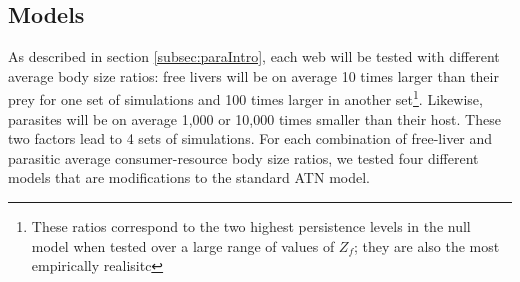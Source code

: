 \documentclass[11pt]{amsart}
\begin{document}
\subsection{Models\label{subsec:models}}

As described in section \ref{subsec:paraIntro}, each web will be tested with different average body size ratios: free livers will be on average 10 times larger than their prey for one set of simulations and 100 times larger in another set\footnote{These ratios correspond to the two highest persistence levels in the null model when tested over a large range of values of $Z_f$; they are also the most empirically realisitc}.  Likewise, parasites will be on average 1,000 or 10,000 times smaller than their host.  These two factors lead to 4 sets of simulations.  For each combination of free-liver and parasitic average consumer-resource body size ratios, we tested four different models that are modifications to the standard ATN model.
\end{document}
